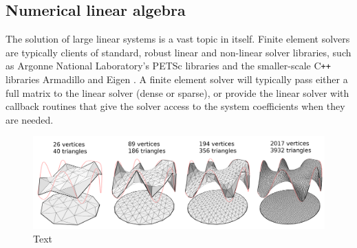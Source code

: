 
\subsection{Numerical linear algebra}
The solution of large linear systems is a vast topic in itself. Finite element solvers are typically clients
of standard, robust linear and non-linear solver libraries, such as Argonne National Laboratory's PETSc libraries \cite{petsc}
and the smaller-scale C\texttt{++} libraries Armadillo \cite{armadillo} and Eigen \cite{eigen}.
A finite element solver will typically pass either a full matrix to the linear solver (dense or sparse),
or provide the linear solver with callback routines that give the solver access to the system coefficients when they are needed.

\begin{figure}[H]
    \begin{center}
        \includegraphics[width=\linewidth]{figures/laplace/laplacev2.png}
    \end{center}
    \caption{\scriptsize
        Text
    }
    \label{laplace_solution}
\end{figure}


% 
% 

